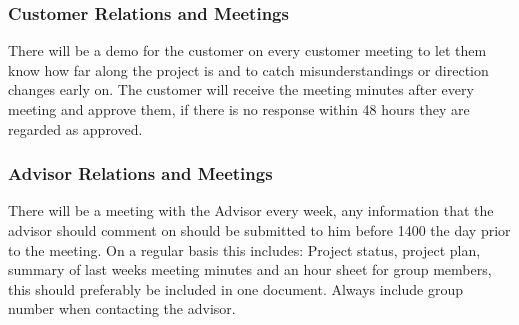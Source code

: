 \subsubsection{Customer Relations and Meetings}

There will be a demo for the customer on every customer meeting to let them
know how far along the project is and to catch misunderstandings or direction changes early on.
The customer will receive the meeting minutes after every meeting and approve them,
if there is no response within 48 hours they are regarded as approved.

\subsubsection{Advisor Relations and Meetings}

There will be a meeting with the Advisor every week, any information that the advisor
should comment on should be submitted to him before 1400 the day prior to the meeting.
On a regular basis this includes: Project status, project plan, summary of last weeks
meeting minutes and an hour sheet for group members, this should preferably be included in one document.
Always include group number when contacting the advisor.
